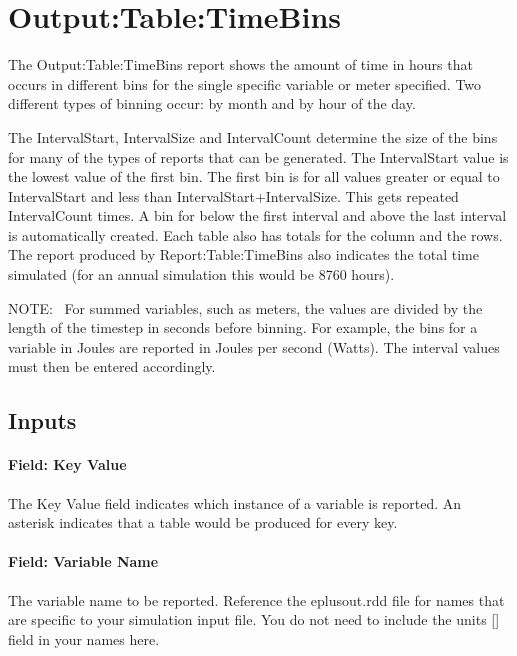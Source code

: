 \section{Output:Table:TimeBins}\label{outputtabletimebins}

The Output:Table:TimeBins report shows the amount of time in hours that occurs in different bins for the single specific variable or meter specified. Two different types of binning occur: by month and by hour of the day.

The IntervalStart, IntervalSize and IntervalCount determine the size of the bins for many of the types of reports that can be generated. The IntervalStart value is the lowest value of the first bin. The first bin is for all values greater or equal to IntervalStart and less than IntervalStart+IntervalSize. This gets repeated IntervalCount times. A bin for below the first interval and above the last interval is automatically created. Each table also has totals for the column and the rows. The report produced by Report:Table:TimeBins also indicates the total time simulated (for an annual simulation this would be 8760 hours).

NOTE:~ For summed variables, such as meters, the values are divided by the length of the timestep in seconds before binning. For example, the bins for a variable in Joules are reported in Joules per second (Watts). The interval values must then be entered accordingly.

\subsection{Inputs}\label{inputs-065}

\paragraph{Field: Key Value}\label{field-key-value-000}

The Key Value field indicates which instance of a variable is reported. An asterisk indicates that a table would be produced for every key.

\paragraph{Field: Variable Name}\label{field-variable-name-000}

The variable name to be reported. Reference the eplusout.rdd file for names that are specific to your simulation input file. You do not need to include the units {[]} field in your names here.

